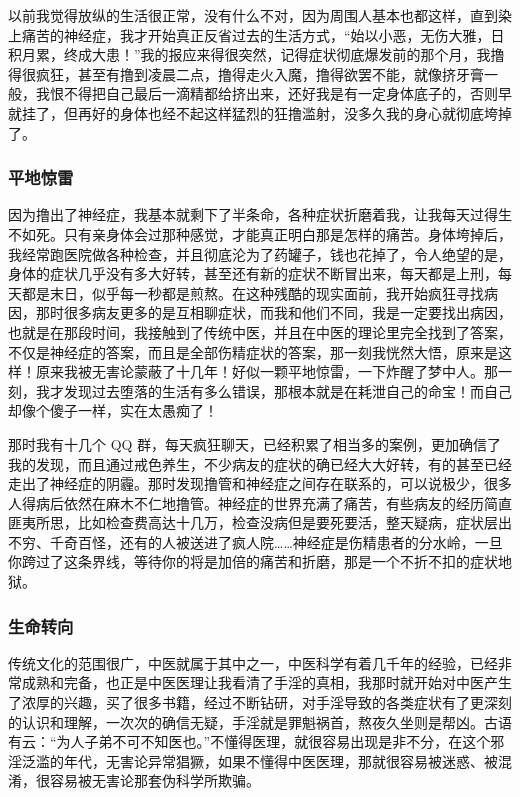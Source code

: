以前我觉得放纵的生活很正常，没有什么不对，因为周围人基本也都这样，直到染上痛苦的神经症，我才开始真正反省过去的生活方式，“始以小恶，无伤大雅，日积月累，终成大患！”我的报应来得很突然，记得症状彻底爆发前的那个月，我撸得很疯狂，甚至有撸到凌晨二点，撸得走火入魔，撸得欲罢不能，就像挤牙膏一般，我恨不得把自己最后一滴精都给挤出来，还好我是有一定身体底子的，否则早就挂了，但再好的身体也经不起这样猛烈的狂撸滥射，没多久我的身心就彻底垮掉了。

\subsubsection{平地惊雷}

因为撸出了神经症，我基本就剩下了半条命，各种症状折磨着我，让我每天过得生不如死。只有亲身体会过那种感觉，才能真正明白那是怎样的痛苦。身体垮掉后，我经常跑医院做各种检查，并且彻底沦为了药罐子，钱也花掉了，令人绝望的是，身体的症状几乎没有多大好转，甚至还有新的症状不断冒出来，每天都是上刑，每天都是末日，似乎每一秒都是煎熬。在这种残酷的现实面前，我开始疯狂寻找病因，那时很多病友更多的是互相聊症状，而我和他们不同，我是一定要找出病因，也就是在那段时间，我接触到了传统中医，并且在中医的理论里完全找到了答案，不仅是神经症的答案，而且是全部伤精症状的答案，那一刻我恍然大悟，原来是这样！原来我被无害论蒙蔽了十几年！好似一颗平地惊雷，一下炸醒了梦中人。那一刻，我才发现过去堕落的生活有多么错误，那根本就是在耗泄自己的命宝！而自己却像个傻子一样，实在太愚痴了！

那时我有十几个 QQ 群，每天疯狂聊天，已经积累了相当多的案例，更加确信了我的发现，而且通过戒色养生，不少病友的症状的确已经大大好转，有的甚至已经走出了神经症的阴霾。那时发现撸管和神经症之间存在联系的，可以说极少，很多人得病后依然在麻木不仁地撸管。神经症的世界充满了痛苦，有些病友的经历简直匪夷所思，比如检查费高达十几万，检查没病但是要死要活，整天疑病，症状层出不穷、千奇百怪，还有的人被送进了疯人院……神经症是伤精患者的分水岭，一旦你跨过了这条界线，等待你的将是加倍的痛苦和折磨，那是一个不折不扣的症状地狱。

\subsubsection{生命转向}

传统文化的范围很广，中医就属于其中之一，中医科学有着几千年的经验，已经非常成熟和完备，也正是中医医理让我看清了手淫的真相，我那时就开始对中医产生了浓厚的兴趣，买了很多书籍，经过不断钻研，对手淫导致的各类症状有了更深刻的认识和理解，一次次的确信无疑，手淫就是罪魁祸首，熬夜久坐则是帮凶。古语有云：“为人子弟不可不知医也。”不懂得医理，就很容易出现是非不分，在这个邪淫泛滥的年代，无害论异常猖獗，如果不懂得中医医理，那就很容易被迷惑、被混淆，很容易被无害论那套伪科学所欺骗。

